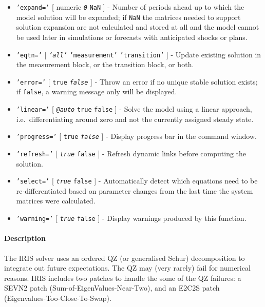 \begin{itemize}
\item
  \texttt{'expand='} {[} numeric \textbar{} \emph{\texttt{0}} \textbar{}
  \texttt{NaN} {]} - Number of periods ahead up to which the model
  solution will be expanded; if \texttt{NaN} the matrices needed to
  support solution expansion are not calculated and stored at all and
  the model cannot be used later in simulations or forecasts with
  anticipated shocks or plans.
\item
  \texttt{'eqtn='} {[} \emph{\texttt{'all'}} \textbar{}
  \texttt{'measurement'} \textbar{} \texttt{'transition'} {]} - Update
  existing solution in the measurement block, or the transition block,
  or both.
\item
  \texttt{'error='} {[} \texttt{true} \textbar{} \emph{\texttt{false}}
  {]} - Throw an error if no unique stable solution exists; if
  \texttt{false}, a warning message only will be displayed.
\item
  \texttt{'linear='} {[} \emph{\texttt{@auto}} \textbar{} \texttt{true}
  \textbar{} \texttt{false} {]} - Solve the model using a linear
  approach, i.e.~differentiating around zero and not the currently
  assigned steady state.
\item
  \texttt{'progress='} {[} \texttt{true} \textbar{}
  \emph{\texttt{false}} {]} - Display progress bar in the command
  window.
\item
  \texttt{'refresh='} {[} \emph{\texttt{true}} \textbar{} \texttt{false}
  {]} - Refresh dynamic links before computing the solution.
\item
  \texttt{'select='} {[} \emph{\texttt{true}} \textbar{} \texttt{false}
  {]} - Automatically detect which equations need to be
  re-differentiated based on parameter changes from the last time the
  system matrices were calculated.
\item
  \texttt{'warning='} {[} \emph{\texttt{true}} \textbar{} \texttt{false}
  {]} - Display warnings produced by this function.
\end{itemize}

\paragraph{Description}\label{description}

The IRIS solver uses an ordered QZ (or generalised Schur) decomposition
to integrate out future expectations. The QZ may (very rarely) fail for
numerical reasons. IRIS includes two patches to handle the some of the
QZ failures: a SEVN2 patch (Sum-of-EigenValues-Near-Two), and an E2C2S
patch (Eigenvalues-Too-Close-To-Swap).

